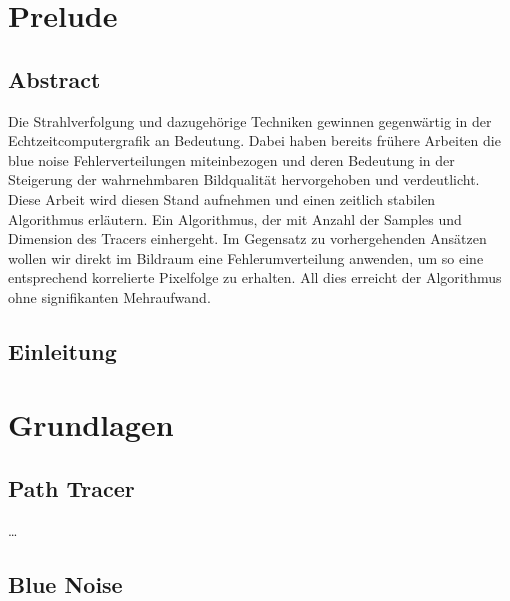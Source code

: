 
\chapter{Prelude}
\label{ch:Introduction}

\section{Abstract}

\vspace*{\fill}
Die Strahlverfolgung und dazugehörige Techniken gewinnen gegenwärtig in der Echtzeitcomputergrafik an Bedeutung. Dabei haben bereits frühere Arbeiten
die blue noise Fehlerverteilungen miteinbezogen und deren Bedeutung in der Steigerung der wahrnehmbaren Bildqualität hervorgehoben und verdeutlicht.
Diese Arbeit wird diesen Stand aufnehmen und einen zeitlich stabilen Algorithmus erläutern. Ein Algorithmus, der mit Anzahl der Samples und Dimension
des Tracers einhergeht. Im Gegensatz zu vorhergehenden Ansätzen wollen wir direkt im Bildraum eine Fehlerumverteilung anwenden, um so eine entsprechend 
korrelierte Pixelfolge zu erhalten. All dies erreicht der Algorithmus ohne signifikanten Mehraufwand.
\vfill

\newpage

\section{Einleitung}

\chapter{Grundlagen}
\label{ch:Grundlagen}


\section{Path Tracer}
\label{ch:Content1:sec:PathTracer}


\dots


\section{Blue Noise}
\label{ch:Content1:sec:BlueNoise}


